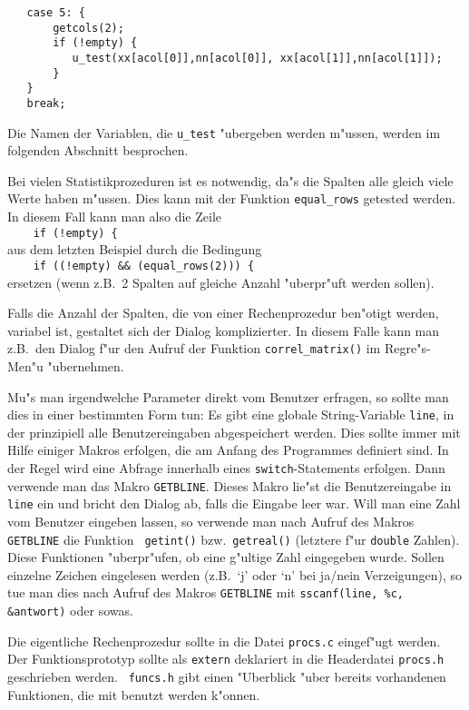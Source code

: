 \begin{verbatim}
   case 5: {
       getcols(2);
       if (!empty) {
          u_test(xx[acol[0]],nn[acol[0]], xx[acol[1]],nn[acol[1]]);
       }
   }
   break;
\end{verbatim}

Die Namen der Variablen, die {\tt u\_test} "ubergeben werden m"ussen,
werden im folgenden Abschnitt besprochen.

Bei vielen Statistikprozeduren ist es notwendig, da"s die Spalten alle gleich
viele Werte haben m"ussen. Dies kann mit der Funktion {\tt equal\_rows}
getested werden. In diesem Fall kann man also die Zeile \\
\verb|    if (!empty) { | \\
aus dem letzten Beispiel durch die Bedingung \\
\verb|    if ((!empty) && (equal_rows(2))) { |  \\
ersetzen (wenn z.B.\ 2 Spalten auf gleiche Anzahl "uberpr"uft werden
sollen).

Falls die Anzahl der Spalten, die von einer Rechenprozedur ben"otigt
werden, variabel ist, gestaltet sich der Dialog komplizierter. In diesem
Falle kann man z.B.\ den Dialog f"ur den Aufruf der Funktion
{\tt correl\_matrix()} im Regre"s-Men"u "ubernehmen.

Mu"s man irgendwelche Parameter direkt vom Benutzer erfragen, so sollte
man dies in einer bestimmten Form tun: Es gibt eine globale
String-Variable {\tt line}, in der prinzipiell alle Benutzereingaben
abgespeichert werden. Dies sollte immer mit Hilfe einiger Makros
erfolgen, die am Anfang des Programmes definiert sind. In der Regel
wird eine Abfrage innerhalb eines {\tt switch}-Statements erfolgen.
Dann verwende man das Makro {\tt GETBLINE}. Dieses Makro lie"st die
Benutzereingabe in {\tt line} ein und bricht den Dialog ab, falls die
Eingabe leer war. Will man eine Zahl vom Benutzer eingeben lassen, so
verwende man nach Aufruf des Makros {\tt GETBLINE} die Funktion {\tt
getint()} bzw.\ {\tt getreal()} (letztere f"ur {\tt double} Zahlen). Diese
Funktionen "uberpr"ufen, ob eine g"ultige Zahl eingegeben wurde. Sollen
einzelne Zeichen eingelesen werden (z.B.\ `j' oder `n' bei ja/nein
Verzeigungen), so tue man dies nach Aufruf des Makros {\tt GETBLINE} mit
{\tt sscanf(line, \dq \%c\dq, \&antwort)} oder sowas.

Die eigentliche Rechenprozedur sollte in die Datei {\tt procs.c}
eingef"ugt werden. Der Funktionsprototyp sollte als {\tt extern}
deklariert in die Headerdatei {\tt procs.h} geschrieben werden. {\tt
  funcs.h} gibt einen "Uberblick "uber bereits vorhandenen Funktionen,
die mit benutzt werden k"onnen.

